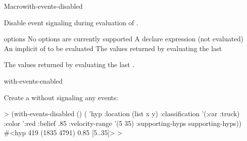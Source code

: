 \documentclass[10pt,twoside,english,pdftex]{article}
\begin{document}

\begin{functiondoc}{Macro}{with-events-disabled}%
  {
    }
%
%
  
\fnsyntax

\fnpurpose Disable event signaling during evaluation of .

\fnpackage {}

\fnmodule {}

\fnargs
\begin{args}{options}
\arg[option] No options are currently supported
\arg[declaration] A declare expression (not evaluated)
\arg[forms] An implicit  of  to be evaluated
\arg[results] The values returned by evaluating the last 
\end{args}

\fnreturns The values returned by evaluating the last .

\begin{alsos}{with-events-enabled}
\end{alsos}

\fnexample
{}%
Create a  without signaling any events:
%
\W\supp
\begin{example}
  > (with-events-disabled ()
       ( 'hyp 
          :location (list x y)
          :classification '(:car :truck)
          :color ':red
          :belief .85
          :velocity-range '(5 35)
          :supporting-hyps supporting-hyps))
  #<hyp 419 (1835 4791) 0.85 [5..35]>
  >
\end{example}

\end{functiondoc}

\end{document}
